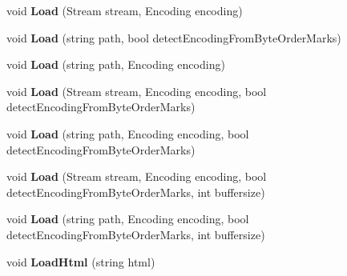 \begin{DoxyCompactItemize}
\item 
\mbox{\label{class_html_agility_pack_1_1_mixed_code_document_ab122cc473dbdec79c070d14e81b0535a}} 
void {\bfseries Load} (Stream stream, Encoding encoding)
\item 
\mbox{\label{class_html_agility_pack_1_1_mixed_code_document_aea6a823ade2433568bda89678b0281f2}} 
void {\bfseries Load} (string path, bool detect\+Encoding\+From\+Byte\+Order\+Marks)
\item 
\mbox{\label{class_html_agility_pack_1_1_mixed_code_document_ae93c8beed86c3ab3de863705ff0562b5}} 
void {\bfseries Load} (string path, Encoding encoding)
\item 
\mbox{\label{class_html_agility_pack_1_1_mixed_code_document_a52034e0257211603b51b4cb3fefe8150}} 
void {\bfseries Load} (Stream stream, Encoding encoding, bool detect\+Encoding\+From\+Byte\+Order\+Marks)
\item 
\mbox{\label{class_html_agility_pack_1_1_mixed_code_document_a363b56f6cc787f5faf24ddf0fde47f4a}} 
void {\bfseries Load} (string path, Encoding encoding, bool detect\+Encoding\+From\+Byte\+Order\+Marks)
\item 
\mbox{\label{class_html_agility_pack_1_1_mixed_code_document_a68233a50b9b68366828831ab1a36ad92}} 
void {\bfseries Load} (Stream stream, Encoding encoding, bool detect\+Encoding\+From\+Byte\+Order\+Marks, int buffersize)
\item 
\mbox{\label{class_html_agility_pack_1_1_mixed_code_document_a2499be15fa6ad7232cd0933073611031}} 
void {\bfseries Load} (string path, Encoding encoding, bool detect\+Encoding\+From\+Byte\+Order\+Marks, int buffersize)
\item 
\mbox{\label{class_html_agility_pack_1_1_mixed_code_document_a77a5056a6b5cdf3f622eb9b138ade1ad}} 
void {\bfseries Load\+Html} (string html)

\end{DoxyCompactItemize}
